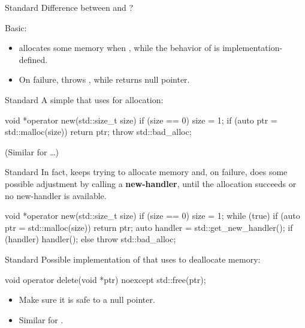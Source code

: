\documentclass{beamer}
\begin{document}
\begin{frame}{Standard }
  Difference between  and ?
  \pause
  \par Basic:
  \begin{itemize}
    \item {} allocates some memory when , while the behavior of  is implementation-defined.
    \item On failure,  throws , while  returns null pointer.
  \end{itemize}
\end{frame}

\begin{frame}[fragile]{Standard }
  A simple  that uses  for allocation:
  \begin{cpp}
void *operator new(std::size_t size) {
  if (size == 0)
    size = 1;
  if (auto ptr = std::malloc(size))
    return ptr;
  throw std::bad_alloc{};
}
  \end{cpp}
  (Similar for \ttt{[]}\dots)
\end{frame}

\begin{frame}[fragile]{Standard }
  In fact,  keeps trying to allocate memory and, on failure, does some possible adjustment by calling a \textbf{new-handler}, until the allocation succeeds or no new-handler is available.
  \begin{cpp}
void *operator new(std::size_t size) {
  if (size == 0) size = 1;
  while (true) {
    if (auto ptr = std::malloc(size))
      return ptr;
    auto handler = std::get_new_handler();
    if (handler)
      handler();
    else
      throw std::bad_alloc{};
  }
}
  \end{cpp}
\end{frame}

\begin{frame}[fragile]{Standard }
  Possible implementation of  that uses  to deallocate memory:
  \begin{cpp}
void operator delete(void *ptr) noexcept {
  std::free(ptr);
}
  \end{cpp}
  \begin{itemize}
    \item Make sure it is safe to  a null pointer.
    \item Similar for \ttt{[]}.
  \end{itemize}
\end{frame}
\end{document}
